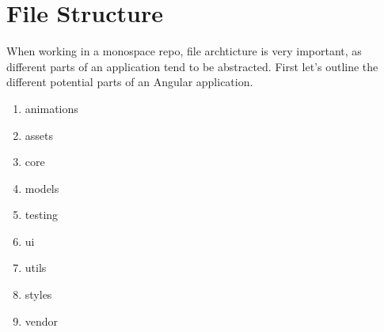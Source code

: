\maketitle{}
\section{ File Structure }

When working in a monospace repo, file archticture is very important, as
different parts of an application tend to be abstracted. First let's outline
the different potential parts of an Angular application.

\begin{enumerate}
  \item animations
  \item assets
  \item core
  \item models
  \item testing
  \item ui
  \item utils
  \item styles
  \item vendor
\end{enumerate}

